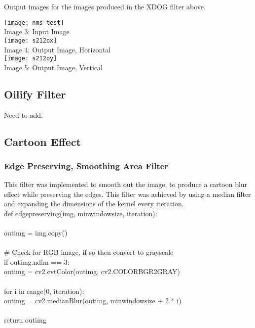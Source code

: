 \documentclass{article}
\begin{document}
	Output images for the images produced in the XDOG filter above.\\
	
	\begin{center}
		\noindent \texttt{[image: nms-test]}\\
		Image 3: Input Image\\
		
		\texttt{[image: s212ox]}\\
		Image 4: Output Image, Horizontal\\
		
		\texttt{[image: s212oy]}\\
		Image 5: Output Image, Vertical\\
	\end{center}
	
	\subsection{Oilify Filter}
	
	Need to add.
	
	\subsection{Cartoon Effect}
	
	\subsubsection{Edge Preserving, Smoothing Area Filter}
	
	This filter was implemented to smooth out the image, to produce a cartoon blur effect while preserving the edges. This filter was achieved by using a median filter and expanding the dimensions of the kernel every iteration.\\
	
	\noindent def edge\textunderscore preserving(img, min\textunderscore window\textunderscore size, iteration):\\
	\\
	\indent out\textunderscore img = img.copy()\\
	\\
	\indent \#     Check for RGB image, if so then convert to grayscale\\
	\indent if out\textunderscore img.ndim == 3:   \\      
	\indent \indent out\textunderscore img = cv2.cvtColor(out\textunderscore img, cv2.COLOR\textunderscore BGR2GRAY)\\
	\\
	\indent for i in range(0, iteration):\\
	\indent \indent out\textunderscore img = cv2.medianBlur(out\textunderscore img, min\textunderscore window\textunderscore size + 2 * i)\\
	\\
	\indent return out\textunderscore img\\
	
\end{document}
